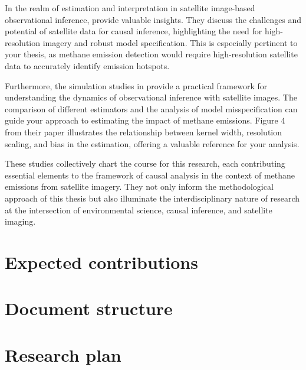 In the realm of estimation and interpretation in satellite image-based observational inference, provide valuable insights. They discuss the challenges and potential of satellite data for causal inference, highlighting the need for high-resolution imagery and robust model specification. This is especially pertinent to your thesis, as methane emission detection would require high-resolution satellite data to accurately identify emission hotspots.

Furthermore, the simulation studies in \cite{jerzak_integrating_2023} provide a practical framework for understanding the dynamics of observational inference with satellite images. The comparison of different estimators and the analysis of model misspecification can guide your approach to estimating the impact of methane emissions. Figure 4 from their paper \cite[Figure 4]{jerzak_integrating_2023} illustrates the relationship between kernel width, resolution scaling, and bias in the estimation, offering a valuable reference for your analysis.

These studies collectively chart the course for this research, each contributing essential elements to the framework of causal analysis in the context of methane emissions from satellite imagery. They not only inform the methodological approach of this thesis but also illuminate the interdisciplinary nature of research at the intersection of environmental science, causal inference, and satellite imaging.


\section{Expected contributions}


\section{Document structure}


\section{Research plan}



